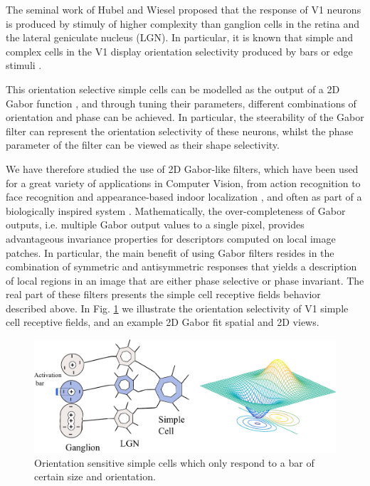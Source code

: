 The seminal work of Hubel and Wiesel \cite{hubel1962receptive} proposed that the response of V1 neurons is produced by stimuly of higher complexity than ganglion cells in the retina and the lateral geniculate nucleus (LGN). In particular, it is known that simple and complex cells in the V1 display orientation selectivity produced by bars or edge stimuli \cite{payne2001cat}.

This orientation selective simple cells can be modelled as the output of a 2D Gabor function \cite{daugman1985uncertainty}, and through tuning their parameters, different combinations of orientation and phase can be achieved. In particular, the steerability of the Gabor filter can represent the orientation selectivity of these neurons, whilst the phase parameter of the filter can be viewed as their shape selectivity. 

We have therefore studied the use of 2D Gabor-like filters, which have been used for a great variety of applications in Computer Vision, from action recognition \cite{shu2014bio} to face recognition \cite{liao2013partial} and appearance-based indoor localization \cite{rivera2015appearance}, and often as part of a biologically inspired system \cite{shu2014bio}. Mathematically, the over-completeness of Gabor outputs, i.e. multiple Gabor output values to a single pixel, provides advantageous invariance properties for descriptors computed on local image patches. In particular, the main benefit of using Gabor filters resides in the combination of symmetric and antisymmetric responses that yields a description of local regions in an image that are either phase selective or phase invariant. The real part of these filters presents the simple cell receptive fields behavior described above. In Fig. \ref{fig:simple_cell} we illustrate the orientation selectivity of V1 simple cell receptive fields, and an example 2D Gabor fit spatial and 2D views.


\begin{figure}[h]
\centering
\includegraphics[width=.8\textwidth]{gfx/Chapter05/simple_cell_gabor.pdf}
\caption{Orientation sensitive simple cells which only respond to a bar of certain size and orientation.}
\label{fig:simple_cell}
\end{figure}

